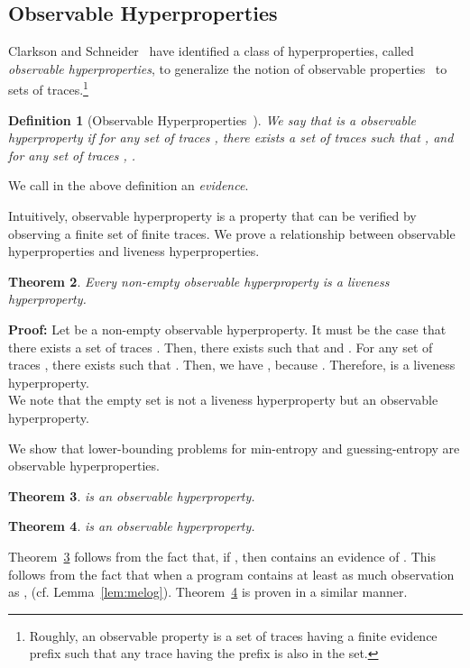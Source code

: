 \documentclass[]{eptcs}
\newtheorem{theorem}{Theorem}[section]
\newtheorem{definition}[theorem]{Definition}
\newenvironment{proof}{\noindent\rm{\bf Proof:}}{\hbox{}\vspace*{0.2\baselineskip}}
\begin{document}
\subsection{Observable Hyperproperties}
Clarkson and Schneider~\cite{DBLP:journals/jcs/ClarksonS10} have
identified a class of hyperproperties, called {\em observable
  hyperproperties}, to generalize the notion of observable
properties~\cite{DBLP:journals/apal/Abramsky91} to sets of
traces.\footnote{Roughly, an observable property is a set of traces
  having a finite evidence prefix such that any trace having the
  prefix is also in the set.}
\begin{definition}[Observable
  Hyperproperties~\cite{DBLP:journals/jcs/ClarksonS10}]
  We say that  is a observable hyperproperty if for any set of
  traces , there exists a set of traces  such
  that , and for any set of traces , .
\end{definition}
We call  in the above definition an {\em evidence}.

Intuitively, observable hyperproperty is a property that can be verified
by observing a finite set of finite traces.  We prove a relationship
between observable hyperproperties and liveness hyperproperties.
\begin{theorem}
\label{thm:nonempty}
  Every non-empty observable hyperproperty is a liveness
  hyperproperty.
\end{theorem}
\begin{proof}
  Let  be a non-empty observable hyperproperty.  It must be the
  case that there exists a set of traces .  Then, there exists
   such that  and .  For any set of traces ,
  there exists  such that .  Then, we have
  , because .  Therefore,  is a
  liveness hyperproperty.
\end{proof}\\
We note that the empty set is not a liveness hyperproperty but an
observable hyperproperty.

We show that lower-bounding problems for min-entropy and
guessing-entropy are observable hyperproperties.
\begin{theorem}
\label{thm:LMEsl}
   is an observable hyperproperty.
\end{theorem}
\begin{theorem}
\label{thm:LGEsl}
   is an observable hyperproperty.
\end{theorem}
Theorem~\ref{thm:LMEsl} follows from the fact that, if , then  contains an evidence of
.  This follows from the fact that when a
program  contains at least as much observation as ,  (cf. Lemma~\ref{lem:melog}).
Theorem~\ref{thm:LGEsl} is proven in a similar manner.
\end{document}
